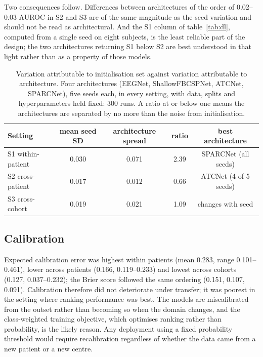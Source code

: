 \documentclass[11pt,a4paper]{article}
\begin{document}
Two consequences follow. Differences between architectures of the order of
0.02--0.03 AUROC in S2 and S3 are of the same magnitude as the seed
variation and should not be read as architectural. And the S1 column of
table~\ref{tab:dl}, computed from a single seed on eight subjects, is the
least reliable part of the design; the two architectures returning S1 below
S2 are best understood in that light rather than as a property of those
models.

\begin{table}[t]
\centering\small
\caption{Variation attributable to initialisation set against variation
attributable to architecture. Four architectures (EEGNet, ShallowFBCSPNet,
ATCNet, SPARCNet), five seeds each, in every setting, with data, splits and
hyperparameters held fixed: 300 runs. A ratio at or below one means the
architectures are separated by no more than the noise from initialisation.}
\label{tab:seed}
\begin{tabular}{lcccc}
\toprule
Setting & mean seed SD & architecture spread & ratio & best architecture \\
\midrule
S1 within-patient & 0.030 & 0.071 & 2.39 & SPARCNet (all seeds) \\
S2 cross-patient  & 0.017 & 0.012 & 0.66 & ATCNet (4 of 5 seeds) \\
S3 cross-cohort   & 0.019 & 0.021 & 1.09 & changes with seed \\
\bottomrule
\end{tabular}
\end{table}

\subsection{Calibration}

Expected calibration error was highest within patients (mean 0.283, range
0.101--0.461), lower across patients (0.166, 0.119--0.233) and lowest across
cohorts (0.127, 0.037--0.232); the Brier score followed the same ordering
(0.151, 0.107, 0.091). Calibration therefore did not deteriorate
under transfer; it was poorest in the setting where ranking performance was
best. The models are miscalibrated from the outset rather than becoming so
when the domain changes, and the class-weighted training objective, which
optimises ranking rather than probability, is the likely reason. Any
deployment using a fixed probability threshold would require recalibration
regardless of whether the data came from a new patient or a new centre.
\end{document}
